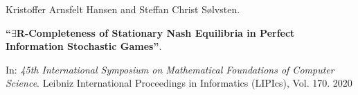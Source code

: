 Kristoffer Arnsfelt Hansen and Steffan Christ Sølvsten.

{\bf ``$\exists$R-Completeness of Stationary Nash Equilibria in Perfect
  Information Stochastic Games''}.

In: \emph{45th International Symposium on Mathematical Foundations of Computer
  Science}. Leibniz International Proceedings in Informatics (LIPIcs), Vol. 170.
2020
